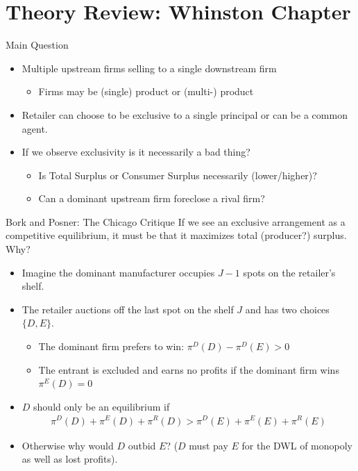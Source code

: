 \documentclass[aspectratio=169,11pt]{beamer}
\begin{document}
\section{Theory Review: Whinston Chapter}

\begin{frame}{Main Question}
\begin{itemize}
\item Multiple upstream firms selling to a single downstream firm
\begin{itemize}
\item Firms may be (single) product or (multi-) product
\end{itemize}
\item Retailer can choose to be \alert{exclusive} to a single principal or can be a \alert{common agent}.
\item If we observe \alert{exclusivity} is it necessarily a bad thing?
\begin{itemize}
\item Is Total Surplus or Consumer Surplus necessarily (lower/higher)?
\item Can a dominant upstream firm \alert{foreclose} a rival firm?
\end{itemize}
\end{itemize}
\end{frame}


\begin{frame}{Bork and Posner: The Chicago Critique}
If we see an exclusive arrangement as a competitive \alert{equilibrium}, it must be that it maximizes total (producer?) surplus. Why?
\begin{itemize}
\item Imagine the dominant manufacturer occupies $J-1$ spots on the retailer's shelf.
\item The retailer auctions off the last spot on the shelf $J$ and has two choices $\{D,E\}$.
\begin{itemize}
\item The dominant firm prefers to win: $\pi^D(D) -\pi^D(E) > 0$
\item The entrant is excluded and earns no profits if the dominant firm wins  $\pi^E(D)= 0$
\end{itemize}
\item $D$ should only be an equilibrium if
\begin{align*}
\pi^D(D) + \pi^E(D) + \pi^R(D) > \pi^D(E) + \pi^E(E) + \pi^R(E)
\end{align*}
\item Otherwise why would $D$ outbid $E$? ($D$ must pay $E$ for the DWL of monopoly as well as lost profits).
\end{itemize}
\end{frame}
\end{document}
